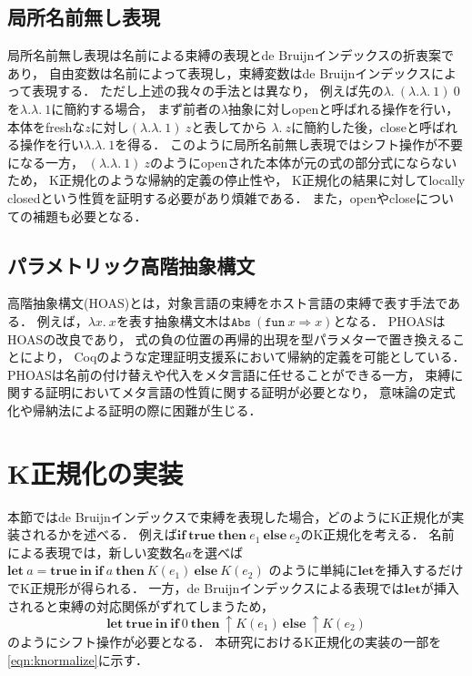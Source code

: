 \documentclass{compsoft}
\newcommand{\keyword}[1]{\mathbf{#1}}
\newcommand{\TRUE}{\keyword{true}}
\newcommand{\IF}{\keyword{if}}
\newcommand{\THEN}{\keyword{then}}
\newcommand{\ELSE}{\keyword{else}}
\newcommand{\LET}{\keyword{let}}
\newcommand{\IN}{\keyword{in}}
\begin{document}
\subsection{局所名前無し表現}
局所名前無し表現\cite{chargueraud-11-ln}は名前による束縛の表現とde Bruijnインデックスの折衷案であり，
自由変数は名前によって表現し，束縛変数はde Bruijnインデックスによって表現する．
ただし上述の我々の手法とは異なり，
例えば先の$\lambda.~(\lambda.\lambda.~1)~0$を$\lambda.\lambda.~1$に簡約する場合，
まず前者の$\lambda$抽象に対しopenと呼ばれる操作を行い，本体をfreshな$z$に対し$(\lambda .\lambda.~1)~z$と表してから
$\lambda.~z$に簡約した後，closeと呼ばれる操作を行い$\lambda.\lambda.~1$を得る．
このように局所名前無し表現ではシフト操作が不要になる一方，
$(\lambda .\lambda.~1)~z$のようにopenされた本体が元の式の部分式にならないため，
K正規化のような帰納的定義の停止性や，
K正規化の結果に対してlocally closedという性質を証明する必要があり煩雑である．
また，openやcloseについての補題も必要となる．

\subsection{パラメトリック高階抽象構文}
高階抽象構文(HOAS)とは，対象言語の束縛をホスト言語の束縛で表す手法である．
例えば，$\lambda x.~x$を表す抽象構文木は$\texttt{Abs}~(\texttt{fun}~x \Rightarrow x)$となる．
PHOAS\cite{Chlipala:2008:PHA:1411204.1411226}はHOASの改良であり，
式の負の位置の再帰的出現を型パラメターで置き換えることにより，
Coqのような定理証明支援系において帰納的定義を可能としている．
PHOASは名前の付け替えや代入をメタ言語に任せることができる一方，
束縛に関する証明においてメタ言語の性質に関する証明が必要となり，
意味論の定式化や帰納法による証明の際に困難が生じる．

\section{K正規化の実装}\label{section:knormal-implement}

本節ではde Bruijnインデックスで束縛を表現した場合，どのようにK正規化が実装されるかを述べる．
例えば$\IF~\TRUE~\THEN~e_1~\ELSE~e_2$のK正規化を考える．
名前による表現では，新しい変数名$a$を選べば$\LET~a = \TRUE~\IN~\IF~a~\THEN~K(e_1)~\ELSE~K(e_2)$
のように単純に$\LET$を挿入するだけでK正規形が得られる．
一方，de Bruijnインデックスによる表現では$\LET$が挿入されると束縛の対応関係がずれてしまうため，
\[\LET~\TRUE~\IN~\IF~0~\THEN~\uparrow K(e_1)~\ELSE~\uparrow K(e_2)\]
のようにシフト操作が必要となる．
本研究におけるK正規化の実装の一部を\figurename\ref{eqn:knormalize}に示す．
\end{document}
